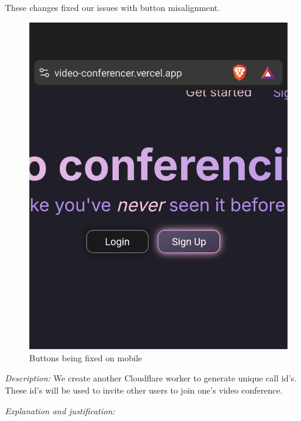 These changes fixed our issues with button misalignment.

\begin{figure}[H]
\centering

\includegraphics[scale=0.2]{Images/Buttons_aligned.png}

\caption{Buttons being fixed on mobile}
\end{figure}

\textit{Description:} We create another Cloudflare worker to 
generate unique call id's. These id's will be used to invite 
other users to join one's video conference. \\ \vspace{0.2cm}

\textit{Explanation and justification:} \\ \vspace{0.2cm}
